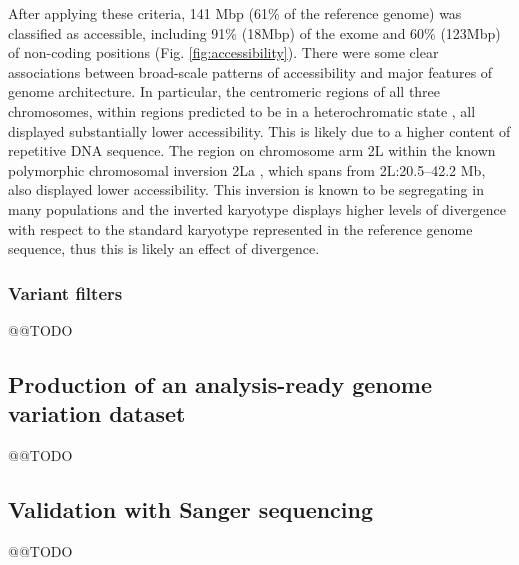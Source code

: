 \documentclass[a4paper,11pt,abstracton,hidelinks]{scrartcl}
\begin{document}
After applying these criteria, 141 Mbp (61\% of the reference genome) was classified as accessible, including 91\% (18Mbp) of the exome and 60\% (123Mbp) of non-coding positions (Fig. \ref{fig:accessibility}).
%
There were some clear associations between broad-scale patterns of accessibility and major features of genome architecture.
%
In particular, the centromeric regions of all three chromosomes, within regions predicted to be in a heterochromatic state \citep{Sharakhova2010}, all displayed substantially lower accessibility.
%
This is likely due to a higher content of repetitive DNA sequence.
%
The region on chromosome arm 2L within the known polymorphic chromosomal inversion 2La \citep{Coluzzi2002}, which spans from 2L:20.5--42.2 Mb, also displayed lower accessibility.
%
This inversion is known to be segregating in many populations and the inverted karyotype displays higher levels of divergence with respect to the standard karyotype represented in the reference genome sequence, thus this is likely an effect of divergence.


\subsubsection{Variant filters}


@@TODO


\subsection{Production of an analysis-ready genome variation dataset}


@@TODO


\subsection{Validation with Sanger sequencing}


@@TODO



\end{document}
